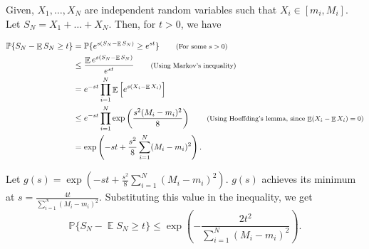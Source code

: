 \documentclass[11pt]{article}
\newenvironment{exercise}[2][Exercise]{\begin{trivlist}
\item[\hskip \labelsep {\bfseries #1}\hskip \labelsep {\bfseries #2.}]}{\end{trivlist}}
\newenvironment{solution}[1][Solution]{\begin{trivlist}
\item[\hskip \labelsep {\bfseries #1}\hskip \labelsep]}{\end{trivlist}}
\DeclareMathOperator*{\E}{\mathbb{E}}
\newcommand*{\annot}[1]{\tag*{\footnotesize{(#1)}}}
\begin{document}
\begin{exercise}{2.2.7}
\end{exercise}

\begin{solution}
Given, $X_1,\ldots,X_N$ are independent random variables such that $X_i \in [m_i,M_i]$. Let $S_N = X_1 + \ldots + X_N$. Then, for $t > 0$, we have

\begin{align*}
\mathbb{P}\{S_N - \E S_N \geq t \} &= \mathbb{P}\{ e^{s(S_N - \E S_N)} \geq e^{st} \} \annot{For some $s>0$} \\
			&\leq \frac{\E e^{s(S_N - \E S_N)}}{e^{st}} \annot{Using Markov's inequality} \\
			&= e^{-st}\prod_{i=1}^N \E\left[ e^{s(X_i - \E X_i)} \right] \\
			&\leq e^{-st}\prod_{i=1}^N \exp \left( \frac{s^2(M_i-m_i)^2}{8} \right)  \annot{Using Hoeffding's lemma, since $\E (X_i - \E X_i) = 0$}\\	
			&= \exp \left( -st + \frac{s^2}{8}\sum_{i=1}^N (M_i - m_i)^2 \right).		
\end{align*}

Let $g(s) = \exp \left( -st + \frac{s^2}{8}\sum_{i=1}^N (M_i - m_i)^2 \right)$. $g(s)$ achieves its minimum at $s = \frac{4t}{\sum_{i=1}^N (M_i - m_i)^2}$. Substituting this value in the inequality, we get
\begin{equation*}
\mathbb{P}\{ S_N - \E S_N \geq t \} \leq \exp \left(- \frac{2t^2}{\sum_{i=1}^N (M_i - m_i)^2} \right).
\end{equation*}
\end{solution}

\begin{exercise}{2.2.8}
\end{exercise}
\end{document}
